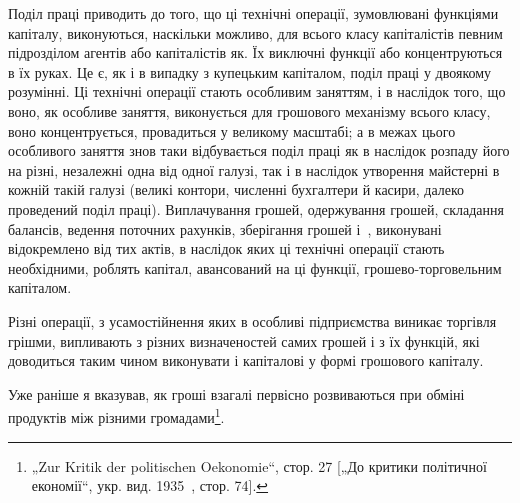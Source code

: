 Поділ праці приводить до того, що ці технічні операції, зумовлювані
функціями капіталу, виконуються, наскільки можливо,
для всього класу капіталістів певним підрозділом агентів або
капіталістів як. Їх виключні функції або концентруються в їх
руках. Це є, як і в випадку з купецьким капіталом, поділ праці
у двоякому розумінні. Ці технічні операції стають особливим заняттям,
і в наслідок того, що воно, як особливе заняття, виконується
для грошового механізму всього класу, воно концентрується, провадиться
у великому масштабі; а в межах цього особливого заняття
знов таки відбувається поділ праці як в наслідок розпаду його
на різні, незалежні одна від одної галузі, так і в наслідок утворення
майстерні в кожній такій галузі (великі контори, численні
бухгалтери й касири, далеко проведений поділ праці).
Виплачування грошей, одержування грошей, складання балансів,
ведення поточних рахунків, зберігання грошей і~, виконувані
відокремлено від тих актів, в наслідок яких ці технічні операції
стають необхідними, роблять капітал, авансований на ці
функції, грошево-торговельним капіталом.

Різні операції, з усамостійнення яких в особливі підприємства
виникає торгівля грішми, випливають з різних визначеностей
самих грошей і з їх функцій, які доводиться таким чином виконувати
і капіталові у формі грошового капіталу.

Уже раніше я вказував, як гроші взагалі первісно розвиваються
при обміні продуктів між різними громадами\footnote{
„Zur Kritik der politischen Oekonomie“, стор. 27 [„До критики політичної
економії“, укр. вид. 1935~, стор. 74].
}.

